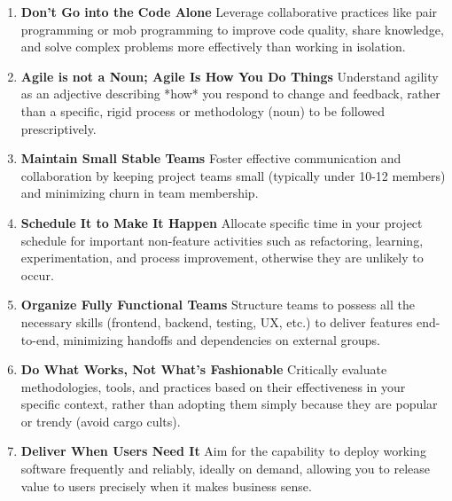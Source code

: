 \documentclass[11pt]{article}
\begin{document}
\begin{tcolorbox}[pragchapterbox={Chapter 9: Pragmatic Projects}]
\small %
\begin{multicols}{2}
\raggedcolumns %
\begin{enumerate}[label=\arabic*., start=82, itemsep=0.8ex, %
                  topsep=0pt, partopsep=0pt, labelwidth=!, labelindent=0pt, leftmargin=*]
    \item \textbf{Don’t Go into the Code Alone}
    Leverage collaborative practices like pair programming or mob programming to improve code quality, share knowledge, and solve complex problems more effectively than working in isolation.

    \item \textbf{Agile is not a Noun; Agile Is How You Do Things}
    Understand agility as an adjective describing *how* you respond to change and feedback, rather than a specific, rigid process or methodology (noun) to be followed prescriptively.

    \item \textbf{Maintain Small Stable Teams}
    Foster effective communication and collaboration by keeping project teams small (typically under 10-12 members) and minimizing churn in team membership.

    \item \textbf{Schedule It to Make It Happen}
    Allocate specific time in your project schedule for important non-feature activities such as refactoring, learning, experimentation, and process improvement, otherwise they are unlikely to occur.

    \item \textbf{Organize Fully Functional Teams}
    Structure teams to possess all the necessary skills (frontend, backend, testing, UX, etc.) to deliver features end-to-end, minimizing handoffs and dependencies on external groups.

    \item \textbf{Do What Works, Not What's Fashionable}
    Critically evaluate methodologies, tools, and practices based on their effectiveness in your specific context, rather than adopting them simply because they are popular or trendy (avoid cargo cults).

    \item \textbf{Deliver When Users Need It}
    Aim for the capability to deploy working software frequently and reliably, ideally on demand, allowing you to release value to users precisely when it makes business sense.


\end{enumerate}
\end{multicols}
\end{tcolorbox}
\end{document}
